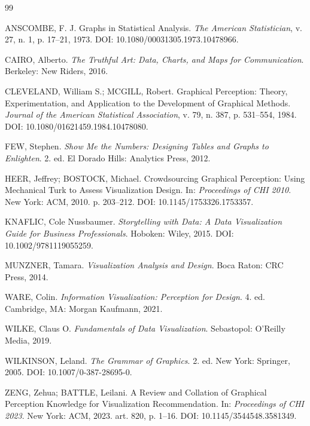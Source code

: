 \begin{thebibliography}{99}

ANSCOMBE, F. J. Graphs in Statistical Analysis. \textit{The American Statistician}, v. 27, n. 1, p. 17--21, 1973. DOI: 10.1080/00031305.1973.10478966.

CAIRO, Alberto. \textit{The Truthful Art: Data, Charts, and Maps for Communication}. Berkeley: New Riders, 2016.

CLEVELAND, William S.; MCGILL, Robert. Graphical Perception: Theory, Experimentation, and Application to the Development of Graphical Methods. \textit{Journal of the American Statistical Association}, v. 79, n. 387, p. 531--554, 1984. DOI: 10.1080/01621459.1984.10478080.

FEW, Stephen. \textit{Show Me the Numbers: Designing Tables and Graphs to Enlighten}. 2. ed. El Dorado Hills: Analytics Press, 2012.

HEER, Jeffrey; BOSTOCK, Michael. Crowdsourcing Graphical Perception: Using Mechanical Turk to Assess Visualization Design. In: \textit{Proceedings of CHI 2010}. New York: ACM, 2010. p. 203--212. DOI: 10.1145/1753326.1753357.

KNAFLIC, Cole Nussbaumer. \textit{Storytelling with Data: A Data Visualization Guide for Business Professionals}. Hoboken: Wiley, 2015. DOI: 10.1002/9781119055259.

MUNZNER, Tamara. \textit{Visualization Analysis and Design}. Boca Raton: CRC Press, 2014.

WARE, Colin. \textit{Information Visualization: Perception for Design}. 4. ed. Cambridge, MA: Morgan Kaufmann, 2021.

WILKE, Claus O. \textit{Fundamentals of Data Visualization}. Sebastopol: O'Reilly Media, 2019.

WILKINSON, Leland. \textit{The Grammar of Graphics}. 2. ed. New York: Springer, 2005. DOI: 10.1007/0-387-28695-0.

ZENG, Zehua; BATTLE, Leilani. A Review and Collation of Graphical Perception Knowledge for Visualization Recommendation. In: \textit{Proceedings of CHI 2023}. New York: ACM, 2023. art. 820, p. 1--16. DOI: 10.1145/3544548.3581349.

\end{thebibliography}
